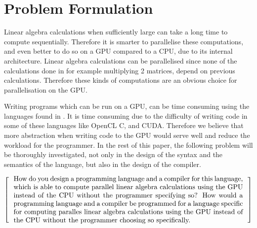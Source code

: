 \newpage
\section{Problem Formulation}

Linear algebra calculations when sufficiently large can take a long time to compute sequentially. 
Therefore it is smarter to parallelise these computations, and even better to do so on a GPU compared to a CPU, due to its internal architecture.
Linear algebra calculations can be parallelised since none of the calculations done in for example multiplying 2 matrices, depend on previous calculations.
Therefore these kinds of computations are an obvious choice for parallelisation on the GPU.

Writing programs which can be run on a GPU, can be time consuming using the languages found in .
It is time consuming due to the difficulty of writing code in some of these languages like OpenCL C, and CUDA.
Therefore we believe that more abstraction when writing code to the GPU would serve well and reduce the workload for the programmer.
In the rest of this paper, the following problem will be thoroughly investigated, not only in the design of the syntax and the semantics of the language, but also in the design of the compiler.

\[
  \left[
  \begin{minipage}{\textwidth}
  \centering
  \begin{minipage}{0.96\textwidth}
  How do you design a programming language and a compiler for this language, which is able to compute parallel linear algebra calculations using the GPU instead of the CPU without the programmer specifying so?
  How would a programming language and a compiler be programmed for a language specific for computing paralles linear algebra calculations using the GPU instead of the CPU without the programmer choosing so specifically.  
  \end{minipage}
  \end{minipage}
    \right]
\]